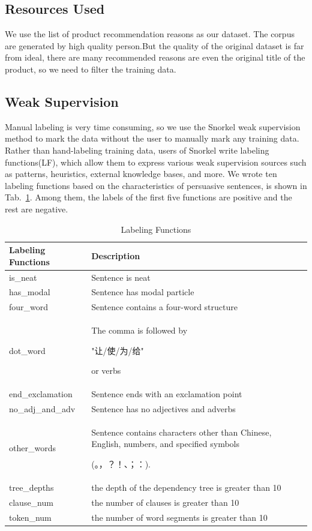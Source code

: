 \documentclass[sigconf]{acmart}
\begin{document}
\subsection{Resources Used}
We use the list of product recommendation reasons as our dataset. The corpus are generated by high quality person.But the quality of the original dataset is far from ideal, there are many recommended reasons are even the original title of the product, so we need to filter the training data.

\subsection{Weak Supervision}
Manual labeling is very time consuming, so we use the Snorkel \cite{ratner2017snorkel} weak supervision method to mark the data without the user to manually mark any training data. Rather than hand-labeling training data, users of Snorkel write labeling functions(LF), which allow them to express various weak supervision sources such as patterns, heuristics, external knowledge bases, and more. We wrote ten labeling functions based on the characteristics of persuasive sentences, is shown in Tab.~\ref{table:LF}. Among them, the labels of the first five functions are positive and the rest are negative.

\begin{table}
  \caption{Labeling Functions}
  \label{table:LF}
  \begin{tabular}{p{2.5cm}p{5cm}}
    \toprule
    Labeling Functions & Description\\
    \midrule
    is\_neat & Sentence is neat\\
    has\_modal & Sentence has modal particle\\
    four\_word & Sentence contains a four-word structure \\
    dot\_word & The comma is followed by
        \begin{CJK*}{UTF8}{gbsn}
            "让/使/为/给"
        \end{CJK*}
        or verbs\\
    end\_exclamation & Sentence ends with an exclamation point\\
    no\_adj\_and\_adv & Sentence has no adjectives and adverbs\\
    other\_words & Sentence contains characters other than Chinese, English, numbers, and specified symbols
        \begin{CJK*}{UTF8}{gbsn}
            (。，？！、；：).
        \end{CJK*}\\
    tree\_depths & the depth of the dependency tree is greater than 10\\
    clause\_num & the number of clauses is greater than 10\\
    token\_num & the number of word segments is greater than 10\\
  \bottomrule
\end{tabular}
\end{table}
\end{document}
